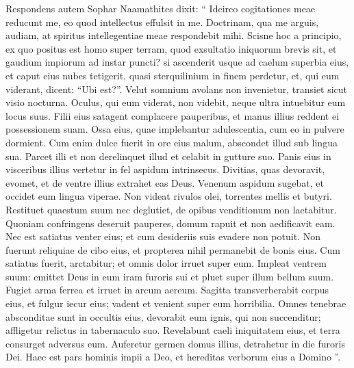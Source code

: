 \begin{biblechapter}
\begin{biblechapter}
\begin{biblechapter}
\begin{biblechapter}
\begin{biblechapter}
\begin{biblechapter}
\begin{biblechapter}
\begin{biblechapter}
\begin{biblechapter}
\begin{biblechapter}
\begin{biblechapter}
\begin{biblechapter}
\begin{biblechapter}
\begin{biblechapter}
\begin{biblechapter}
\begin{biblechapter}
\begin{biblechapter}
\begin{biblechapter}
\begin{biblechapter}
\begin{biblechapter}
\verse Respondens autem Sophar Naamathites dixit:
 \verse “ Idcirco cogitationes meae reducunt me,
 eo quod intellectus effulsit in me.
 \verse Doctrinam, qua me arguis, audiam,
 at spiritus intellegentiae meae respondebit mihi.
 \verse Scisne hoc a principio,
 ex quo positus est homo super terram,
 \verse quod exsultatio iniquorum brevis sit,
 et gaudium impiorum ad instar puncti?
 \verse si ascenderit usque ad caelum superbia eius,
 et caput eius nubes tetigerit,
 \verse quasi sterquilinium in finem perdetur,
 et, qui eum viderant, dicent: “Ubi est?”.
 \verse Velut somnium avolans non invenietur,
 transiet sicut visio nocturna.
 \verse Oculus, qui eum viderat, non videbit,
 neque ultra intuebitur eum locus suus.
 \verse Filii eius satagent complacere pauperibus,
 et manus illius reddent ei possessionem suam.
 \verse Ossa eius, quae implebantur adulescentia,
 cum eo in pulvere dormient.
 \verse Cum enim dulce fuerit in ore eius malum,
 abscondet illud sub lingua sua.
 \verse Parcet illi et non derelinquet illud
 et celabit in gutture suo.
 \verse Panis eius in visceribus illius
 vertetur in fel aspidum intrinsecus.
 \verse Divitias, quas devoravit, evomet,
 et de ventre illius extrahet eas Deus.
 \verse Venenum aspidum sugebat,
 et occidet eum lingua viperae.
 \verse Non videat rivulos olei,
 torrentes mellis et butyri.
 \verse Restituet quaestum suum nec deglutiet,
 de opibus venditionum non laetabitur.
 \verse Quoniam confringens deseruit pauperes,
 domum rapuit et non aedificavit eam.
 \verse Nec est satiatus venter eius;
 et cum desideriis suis evadere non potuit.
 \verse Non fuerunt reliquiae de cibo eius,
 et propterea nihil permanebit de bonis eius.
 \verse Cum satiatus fuerit, arctabitur;
 et omnis dolor irruet super eum.
 \verse Impleat ventrem suum:
 emittet Deus in eum iram furoris sui
 et pluet super illum bellum suum.
 \verse Fugiet arma ferrea
 et irruet in arcum aereum.
 \verse Sagitta transverberabit corpus eius,
 et fulgur iecur eius;
 vadent et venient super eum horribilia.
 \verse Omnes tenebrae absconditae sunt in occultis eius,
 devorabit eum ignis, qui non succenditur;
 affligetur relictus in tabernaculo suo.
 \verse Revelabunt caeli iniquitatem eius,
 et terra consurget adversus eum.
 \verse Auferetur germen domus illius,
 detrahetur in die furoris Dei.
 \verse Haec est pars hominis impii a Deo,
 et hereditas verborum eius a Domino ”.
 

\end{biblechapter}
\end{biblechapter}
\end{biblechapter}
\end{biblechapter}
\end{biblechapter}
\end{biblechapter}
\end{biblechapter}
\end{biblechapter}
\end{biblechapter}
\end{biblechapter}
\end{biblechapter}
\end{biblechapter}
\end{biblechapter}
\end{biblechapter}
\end{biblechapter}
\end{biblechapter}
\end{biblechapter}
\end{biblechapter}
\end{biblechapter}
\end{biblechapter}
